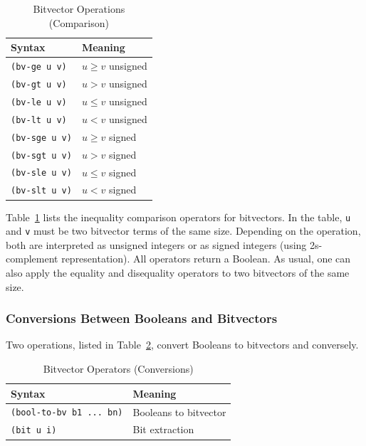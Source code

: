 \documentclass[11pt,twoside,fleqn,openright,titlepage]{cslreport}
\begin{document}
\begin{table}
\begin{small}
\begin{center}
\begin{tabular}{|p{3cm}|l|}
\hline
Syntax & Meaning \\
\hline
\texttt{(bv-ge u v)} & $u \geq v$ unsigned\\
\texttt{(bv-gt u v)} & $u > v$ unsigned \\
\texttt{(bv-le u v)} & $u \leq v$ unsigned \\
\texttt{(bv-lt u v)} & $u < v$ unsigned \\
\hline
\texttt{(bv-sge u v)} & $u \geq v$ signed\\
\texttt{(bv-sgt u v)} & $u > v$ signed \\
\texttt{(bv-sle u v)} & $u \leq v$ signed \\
\texttt{(bv-slt u v)} & $u < v$ signed \\
\hline
\end{tabular}
\end{center}
\end{small}
\caption{Bitvector Operations (Comparison)}
\label{bitvectors5}
\end{table}

Table~\ref{bitvectors5} lists the inequality comparison operators for
bitvectors. In the table, \texttt{u} and \texttt{v} must be two
bitvector terms of the same size. Depending on the operation, both are
interpreted as unsigned integers or as signed integers (using
2s-complement representation).  All operators return a Boolean. As
usual, one can also apply the equality and disequality operators to
two bitvectors of the same size.


\subsubsection*{Conversions Between Booleans and Bitvectors}

Two operations, listed in Table~\ref{bitvectors6},  convert Booleans
to bitvectors and conversely.

\begin{table}[h]
\begin{small}
\begin{center}
\begin{tabular}{|p{5cm}|l|}
\hline
Syntax & Meaning \\
\hline
\texttt{(bool-to-bv b1 ... bn)} & Booleans to bitvector \\
\texttt{(bit u i)} & Bit extraction\\
\hline
\end{tabular}
\end{center}
\end{small}
\caption{Bitvector Operators (Conversions)}
\label{bitvectors6}
\end{table}
\end{document}
